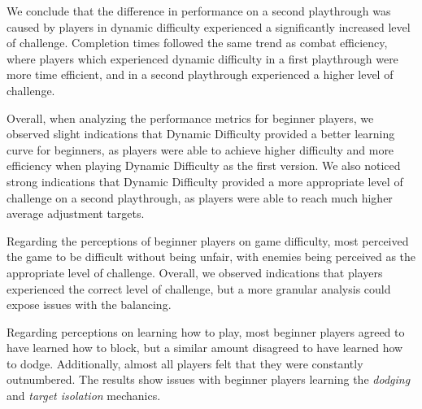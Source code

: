 We conclude that the difference in performance on a second playthrough was caused by players in dynamic difficulty experienced a significantly increased level of challenge. Completion times followed the same trend as combat efficiency, where players which experienced dynamic difficulty in a first playthrough were more time efficient, and in a second playthrough experienced a higher level of challenge.

Overall, when analyzing the performance metrics for beginner players, we observed slight indications that Dynamic Difficulty provided a better learning curve for beginners, as players were able to achieve higher difficulty and more efficiency when playing Dynamic Difficulty as the first version. We also noticed strong indications that Dynamic Difficulty provided a more appropriate level of challenge on a second playthrough, as players were able to reach much higher average adjustment targets.


Regarding the perceptions of beginner players on game difficulty, most perceived the game to be difficult without being unfair, with enemies being perceived as the appropriate level of challenge. Overall, we observed indications that players experienced the correct level of challenge, but a more granular analysis could expose issues with the balancing.

Regarding perceptions on learning how to play, most beginner players agreed to have learned how to block, but a similar amount disagreed to have learned how to dodge. Additionally, almost all players felt that they were constantly outnumbered. The results show issues with beginner players learning the \emph{dodging} and \emph{target isolation} mechanics.

